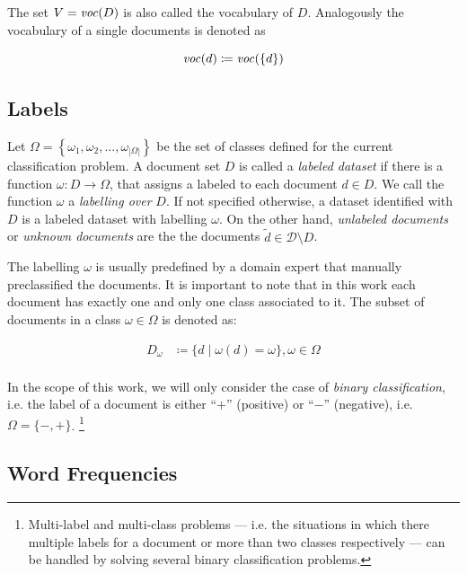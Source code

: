 The set $V=\mathit{voc}(D)$ is also called the vocabulary of $D$.
Analogously the vocabulary of a single documents is denoted as

\begin{equation*}
\mathit{voc}(d) \coloneqq \mathit{voc}(\{d\})
\end{equation*}

\subsection{Labels}

Let $\Omega=\left\{\omega_1, \omega_2,\ldots,\omega_{|\Omega|}\right\}$ be the
set of classes defined for the current classification problem. A document set
$D$ is called a \emph{labeled dataset} if there is a function $\omega: D \to
\Omega$, that assigns a labeled to each document $d \in D$. We call the function
$\omega$ a \emph{labelling over} $D$. If not specified otherwise, a dataset
identified with $D$ is a labeled dataset with labelling $\omega$.
On the other hand, \emph{unlabeled documents} or \emph{unknown documents} are
the the documents $\tilde{d} \in \mathcal{D}\setminus D$. 

The labelling $\omega$ is usually predefined by a domain expert
that manually preclassified the documents.
It is important to note that in this work each document has exactly one and only
one class associated to it. The subset of documents in a class $\omega \in
\Omega$ is denoted as:

\begin{equation*}
\begin{split}
D_\omega &\coloneqq  \{ d \mid \omega(d) = \omega\}, \omega \in \Omega \\
\end{split}
\end{equation*}

In the scope of this work, we will only consider the case of
\emph{binary classification}, i.e. the label of a document is either ``$+$''
(positive) or ``$-$'' (negative), i.e.  $\Omega = \{-,+\}$. \footnote{Multi-label
and multi-class problems --- i.e. the situations in which there multiple labels
for a document or more than two classes respectively --- can be handled by
solving several binary classification problems.}

\subsection{Word Frequencies}

